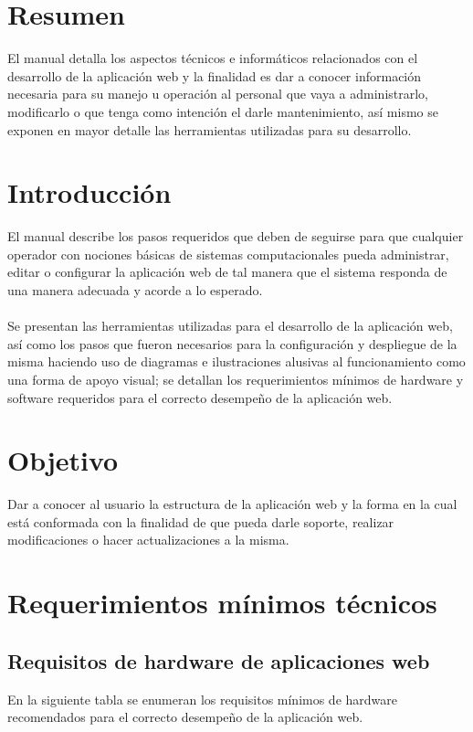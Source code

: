 \documentclass[12pt, a4paper, titlepage]{article}
\begin{document}
	\section{Resumen}
	El manual detalla los aspectos técnicos e informáticos relacionados con el desarrollo de la aplicación web y la finalidad es dar a conocer información necesaria para su manejo u operación al personal que vaya a administrarlo, modificarlo o que tenga como intención el darle mantenimiento, así mismo se exponen en mayor detalle las herramientas utilizadas para su desarrollo.
	\newpage
	\section{Introducción}
	El manual describe los pasos requeridos que deben de seguirse para que cualquier operador con nociones básicas de sistemas computacionales pueda administrar, editar o configurar la aplicación web de tal manera que el sistema responda de una manera adecuada y acorde a lo esperado.\\\\
	Se presentan las herramientas utilizadas para el desarrollo de la aplicación web, así como los pasos que fueron necesarios para la configuración y despliegue de la misma haciendo uso de diagramas e ilustraciones alusivas al funcionamiento como una forma de apoyo visual; se detallan los requerimientos mínimos de hardware y software requeridos para el correcto desempeño de la aplicación web.
	\section{Objetivo}
	Dar a conocer al usuario la estructura de la aplicación web y la forma en la cual está conformada con la finalidad de que pueda darle soporte, realizar modificaciones o hacer actualizaciones a la misma.
	\newpage
	\section{Requerimientos mínimos técnicos}
	\subsection{Requisitos de hardware de aplicaciones web}
	En la siguiente tabla se enumeran los requisitos mínimos de hardware recomendados para el correcto desempeño de la aplicación web.
	
\end{document}
